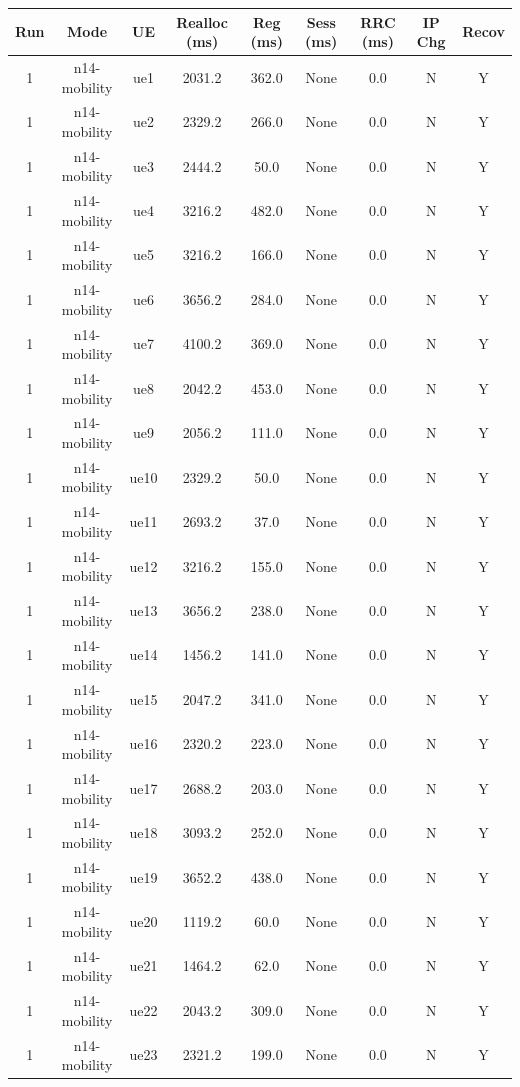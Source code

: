 \begin{table}[ht]
\centering
\begin{tabular}{|c|c|c|c|c|c|c|c|c|}
\hline
Run & Mode & UE & Realloc (ms) & Reg (ms) & Sess (ms) & RRC (ms) & IP Chg & Recov \\
\hline
1 & n14-mobility & ue1 & 2031.2 & 362.0 & None & 0.0 & N & Y \\
1 & n14-mobility & ue2 & 2329.2 & 266.0 & None & 0.0 & N & Y \\
1 & n14-mobility & ue3 & 2444.2 & 50.0 & None & 0.0 & N & Y \\
1 & n14-mobility & ue4 & 3216.2 & 482.0 & None & 0.0 & N & Y \\
1 & n14-mobility & ue5 & 3216.2 & 166.0 & None & 0.0 & N & Y \\
1 & n14-mobility & ue6 & 3656.2 & 284.0 & None & 0.0 & N & Y \\
1 & n14-mobility & ue7 & 4100.2 & 369.0 & None & 0.0 & N & Y \\
1 & n14-mobility & ue8 & 2042.2 & 453.0 & None & 0.0 & N & Y \\
1 & n14-mobility & ue9 & 2056.2 & 111.0 & None & 0.0 & N & Y \\
1 & n14-mobility & ue10 & 2329.2 & 50.0 & None & 0.0 & N & Y \\
1 & n14-mobility & ue11 & 2693.2 & 37.0 & None & 0.0 & N & Y \\
1 & n14-mobility & ue12 & 3216.2 & 155.0 & None & 0.0 & N & Y \\
1 & n14-mobility & ue13 & 3656.2 & 238.0 & None & 0.0 & N & Y \\
1 & n14-mobility & ue14 & 1456.2 & 141.0 & None & 0.0 & N & Y \\
1 & n14-mobility & ue15 & 2047.2 & 341.0 & None & 0.0 & N & Y \\
1 & n14-mobility & ue16 & 2320.2 & 223.0 & None & 0.0 & N & Y \\
1 & n14-mobility & ue17 & 2688.2 & 203.0 & None & 0.0 & N & Y \\
1 & n14-mobility & ue18 & 3093.2 & 252.0 & None & 0.0 & N & Y \\
1 & n14-mobility & ue19 & 3652.2 & 438.0 & None & 0.0 & N & Y \\
1 & n14-mobility & ue20 & 1119.2 & 60.0 & None & 0.0 & N & Y \\
1 & n14-mobility & ue21 & 1464.2 & 62.0 & None & 0.0 & N & Y \\
1 & n14-mobility & ue22 & 2043.2 & 309.0 & None & 0.0 & N & Y \\
1 & n14-mobility & ue23 & 2321.2 & 199.0 & None & 0.0 & N & Y \\

\end{tabular}
\end{table}
